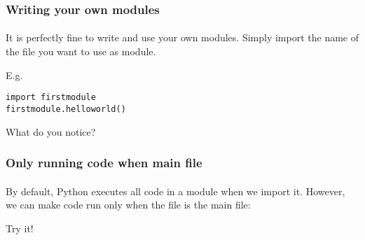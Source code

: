 \begin{frame}\frametitle{Writing your own modules}
    \framesubtitle{}

    It is perfectly fine to write and use your own modules. Simply
    import the name of the file you want to use as module.

    \vfill

    E.g.


    \texttt{import firstmodule}\\
    \texttt{firstmodule.helloworld()}

    \vfill

    What do you notice?

\end{frame}

\begin{frame}\frametitle{Only running code when main file}
    \framesubtitle{}

    By default, Python executes all code in a module when we import it.
    However, we can make code run only when the file is the main file:


    Try it!

\end{frame}

